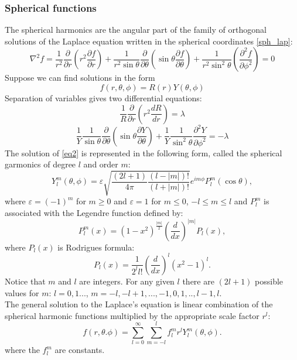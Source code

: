 \documentclass[a4paper, 14pt]{article}
\begin{document}
\subsubsection{Spherical functions}
The spherical harmonics are the angular part of the family of orthogonal solutions of the Laplace equation written in the spherical coordinates \eqref{sph_lap}:
$$\nabla^2 {f} = \frac{1}{r^2} \frac{\partial}{\partial r}({r^2}\frac{\partial f}{\partial r})+\frac{1}{r^2\sin{\theta}}\frac{\partial}{\partial \theta}(\sin{\theta}\frac{\partial f}{\partial \theta})+\frac{1}{r^2\sin^2{\theta}}(\frac{\partial^2 f}{\partial \phi^2}) = 0$$
Suppose we can find solutions in the form $$f({r}, \theta, \phi) = R(r)Y(\theta, \phi)$$
Separation of variables gives two differential equations:
$$\frac{1}{R}\frac{\partial}{\partial r}(r^2 \frac {dR}{dr}) = \lambda$$
\begin{equation}\label{eq2}
	\frac{1}{Y}\frac{1}{\sin{\theta}}\frac{\partial}{\partial \theta}(\sin{\theta}\frac{\partial Y}{\partial \theta})+\frac{1}{Y}\frac{1}{\sin^2{\theta}}\frac{\partial^2 Y}{\partial \phi^2} = -\lambda
\end{equation}
The solution of \eqref{eq2} is represented in the following form, called the spherical garmonics of degree $l$ and order $m$:
\begin{equation}\label{sph_garm}
	Y_l^m(\theta, \phi)=\varepsilon \sqrt{\frac{(2l+1)}{4\pi}\frac{(l-|m|)!}{(l+|m|)!}}e^{im\phi}P_l^m(\cos{\theta}),
\end{equation}
 where $\varepsilon = (-1)^m$ for $m\geq0$ and $\varepsilon=1$ for $m \leq 0$, $-l \leq m \leq l$ and $P_l^m $ is associated with the Legendre function defined by:
	$$P_l^m(x)=(1-x^2)^{\frac{|m|}{2}}(\frac{d}{dx})^{|m|}P_l(x),$$
where $P_l(x) $ is Rodrigues formula:
	$$P_l(x) = \frac{1}{2^l l!}(\frac{d}{dx})^l (x^2-1)^l.$$
Notice that $m$ and $l$ are integers. For any given $l$ there are $(2l+1)$ possible values for $m$: $l=0, 1...$, $m = -l, -l+1,..., -1, 0, 1, .., l-1, l.$\\
The general solution to the Laplace's equation is linear combination of the spherical harmonic functions multiplied by the appropriate scale factor $r^l$:
	$$f(r, \theta. \phi) = \sum_{l=0} ^{\infty}\sum_{m=-l} ^{l}f_l^mr^l Y_l^m(\theta, \phi).$$
where the $f_l^m$ are constants.
\end{document}
